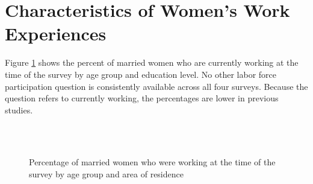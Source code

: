 \documentclass[12pt,letterpaper]{article}
\begin{document}
\section{Characteristics of Women's Work Experiences}


\setcounter{figure}{0}
\setcounter{table}{0}

Figure \ref{fig:work_by_survey} shows the percent of married women who are 
currently working at the time of the survey by age group and education level.
No other labor force participation question is consistently available across all 
four surveys. 
Because the question refers to currently working, the percentages are lower in previous
studies. 

\captionsetup[figure]{skip = 10pt}

\begin{figure}[!htpb]
\centering
{}
\\
\\
\caption{Percentage of married women who were working at the time of the 
survey by age group and area of residence}
\label{fig:work_by_survey}
\end{figure}
\end{document}
